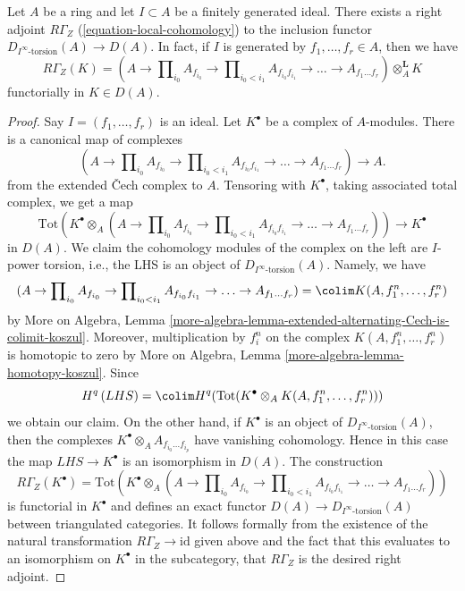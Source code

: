 \begin{lemma}
\label{lemma-local-cohomology-adjoint}
Let $A$ be a ring and let $I \subset A$ be a finitely generated ideal.
There exists a right adjoint $R\Gamma_Z$ (\ref{equation-local-cohomology})
to the inclusion functor $D_{I^\infty\text{-torsion}}(A) \to D(A)$.
In fact, if $I$ is generated by $f_1, \ldots, f_r \in A$, then we have
$$
R\Gamma_Z(K) =
(A \to \prod\nolimits_{i_0} A_{f_{i_0}} \to
\prod\nolimits_{i_0 < i_1} A_{f_{i_0}f_{i_1}}
\to \ldots \to A_{f_1\ldots f_r}) \otimes_A^\mathbf{L} K
$$
functorially in $K \in D(A)$.
\end{lemma}

\begin{proof}
Say $I = (f_1, \ldots, f_r)$ is an ideal.
Let $K^\bullet$ be a complex of $A$-modules.
There is a canonical map of complexes
$$
(A \to \prod\nolimits_{i_0} A_{f_{i_0}} \to
\prod\nolimits_{i_0 < i_1} A_{f_{i_0}f_{i_1}} \to
\ldots \to A_{f_1\ldots f_r}) \longrightarrow A.
$$
from the extended {\v C}ech complex to $A$.
Tensoring with $K^\bullet$, taking associated total complex,
we get a map
$$
\text{Tot}\left(
K^\bullet \otimes_A
(A \to \prod\nolimits_{i_0} A_{f_{i_0}} \to
\prod\nolimits_{i_0 < i_1} A_{f_{i_0}f_{i_1}} \to
\ldots \to A_{f_1\ldots f_r})\right)
\longrightarrow
K^\bullet
$$
in $D(A)$. We claim the cohomology modules of the complex on the left are
$I$-power torsion, i.e., the LHS is an object of
$D_{I^\infty\text{-torsion}}(A)$. Namely, we have
$$
(A \to \prod\nolimits_{i_0} A_{f_{i_0}} \to
\prod\nolimits_{i_0 < i_1} A_{f_{i_0}f_{i_1}} \to
\ldots \to A_{f_1\ldots f_r}) = \colim K(A, f_1^n, \ldots, f_r^n)
$$
by More on Algebra, Lemma
\ref{more-algebra-lemma-extended-alternating-Cech-is-colimit-koszul}.
Moreover, multiplication by $f_i^n$ on the complex
$K(A, f_1^n, \ldots, f_r^n)$ is homotopic to zero by
More on Algebra, Lemma \ref{more-algebra-lemma-homotopy-koszul}.
Since
$$
H^q\left( LHS \right) =
\colim H^q(\text{Tot}(K^\bullet \otimes_A K(A, f_1^n, \ldots, f_r^n)))
$$
we obtain our claim. On the other hand, if $K^\bullet$ is an
object of $D_{I^\infty\text{-torsion}}(A)$, then the complexes
$K^\bullet \otimes_A A_{f_{i_0} \ldots f_{i_p}}$ have vanishing
cohomology. Hence in this case the map $LHS \to K^\bullet$
is an isomorphism in $D(A)$. The construction
$$
R\Gamma_Z(K^\bullet) =
\text{Tot}\left(
K^\bullet \otimes_A
(A \to \prod\nolimits_{i_0} A_{f_{i_0}} \to
\prod\nolimits_{i_0 < i_1} A_{f_{i_0}f_{i_1}} \to
\ldots \to A_{f_1\ldots f_r})\right)
$$
is functorial in $K^\bullet$ and defines an exact functor
$D(A) \to D_{I^\infty\text{-torsion}}(A)$ between
triangulated categories. It follows formally from the
existence of the natural transformation $R\Gamma_Z \to \text{id}$
given above and the fact that this evaluates to an isomorphism
on $K^\bullet$ in the subcategory, that $R\Gamma_Z$ is the desired
right adjoint.
\end{proof}